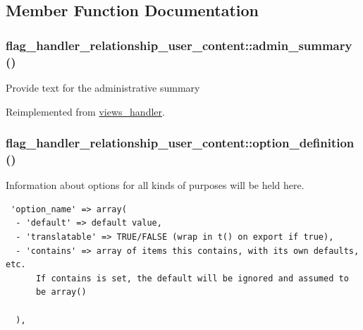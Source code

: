 \subsection{Member Function Documentation}
\hypertarget{classflag__handler__relationship__user__content_4612285c2176c18f0bcc809531ab22ee}{
\subsubsection[{admin\_\-summary}]{\setlength{\rightskip}{0pt plus 5cm}flag\_\-handler\_\-relationship\_\-user\_\-content::admin\_\-summary ()}}
\label{classflag__handler__relationship__user__content_4612285c2176c18f0bcc809531ab22ee}


Provide text for the administrative summary 

Reimplemented from \hyperlink{classviews__handler_27a5cb35f3f17322957730a95b6be11e}{views\_\-handler}.\hypertarget{classflag__handler__relationship__user__content_2bbdef4e35eff90f4a109390bca06d95}{
\subsubsection[{option\_\-definition}]{\setlength{\rightskip}{0pt plus 5cm}flag\_\-handler\_\-relationship\_\-user\_\-content::option\_\-definition ()}}
\label{classflag__handler__relationship__user__content_2bbdef4e35eff90f4a109390bca06d95}


Information about options for all kinds of purposes will be held here. 

\begin{Code}\begin{verbatim} 'option_name' => array(
  - 'default' => default value,
  - 'translatable' => TRUE/FALSE (wrap in t() on export if true),
  - 'contains' => array of items this contains, with its own defaults, etc.
      If contains is set, the default will be ignored and assumed to
      be array()

  ),
\end{verbatim}
\end{Code}


